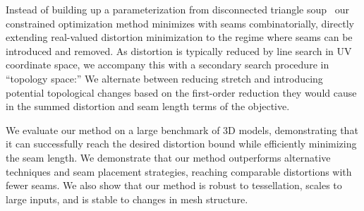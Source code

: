%
%
Instead of building up a parameterization from disconnected triangle soup~\cite{Poranne2017Autocuts} our constrained optimization method minimizes with seams combinatorially, directly extending real-valued distortion minimization to the regime where seams can be introduced and removed. As distortion is typically reduced by line search in UV coordinate space, we accompany this with a secondary search procedure in ``topology space:'' We alternate between reducing stretch and introducing potential topological changes based on the first-order reduction they would cause in the summed distortion and seam length terms of the objective. %


We evaluate our method on a large benchmark of 3D models, demonstrating that it can successfully reach the desired distortion bound while efficiently minimizing the seam length. We demonstrate that our method outperforms alternative techniques and seam placement strategies, reaching comparable distortions with fewer seams. We also show that our method is robust to tessellation, scales to large inputs, and is stable to changes in mesh structure.~

